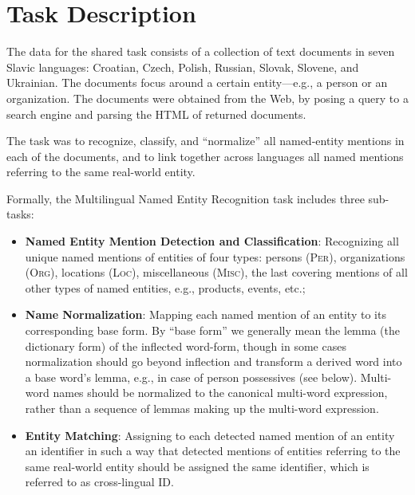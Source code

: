 \documentclass[11pt]{article}
\begin{document}
\section{Task Description}
\label{sec:task}


The data for the shared task consists of a collection of text documents
{in seven Slavic languages: Croatian, Czech, Polish, Russian, Slovak,
  Slovene, and Ukrainian. The documents focus around a certain
  entity---e.g., a person or an organization. The documents were obtained
  from the Web, by posing a query to a search engine and parsing the HTML
  of returned documents.}

The task {was} to recognize, classify, and ``normalize'' all named-entity
mentions in each of the documents, and to link together across languages
all named mentions referring to the same real-world entity.

Formally, the Multilingual Named Entity Recognition task includes three
sub-tasks:

\begin{itemize}

\item \textbf{Named Entity Mention Detection and Classification}:
  Recognizing all unique named mentions of entities of four types:
  persons (\textsc{Per}), organizations (\textsc{Org}), locations (\textsc{Loc}), miscellaneous
  (\textsc{Misc}), the last covering mentions of all other types of named
  entities, e.g., products, events, etc.;

\item \textbf{Name Normalization}: {Mapping each named mention of
    an entity to its corresponding base form. By ``base form'' we
    generally mean the lemma (the dictionary form) of the inflected
    word-form, though in some cases normalization should go beyond
    inflection and transform a derived word into a base word's lemma,
    e.g., in case of person possessives (see below).  Multi-word names
    should be normalized to the canonical multi-word expression, rather
    than a sequence of lemmas making up the multi-word expression.}

\item \textbf{Entity Matching}: Assigning to each detected named mention
  of an entity an identifier in such a way that detected mentions of
  entities referring to the same real-world entity should be assigned the
  same identifier, which is referred to as cross-lingual ID.

\end{itemize}
\end{document}
